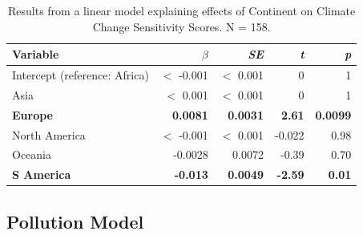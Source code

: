 \documentclass[11pt, a4paper, titlepage]{article}
\begin{document}
	
	\newpage
	
	\begin{table}[h!]
		\begin{center}
			\caption{Results from a linear model explaining effects of Continent on Climate Change Sensitivity Scores. \textmd{N = 158.}}
			\label{tab:climatetable}
			\begin{tabular}{l|r|r|r|r} %
				Variable & $\beta$ & \textit{SE} & \textit{t} & \textit{p}\\
				\hline
				Intercept (reference: Africa) & $<$ -0.001 & $<$ 0.001 & 0 & 1\\
				Asia & $<$ 0.001 & $<$ 0.001& 0 & 1\\
				\textbf{Europe} & \textbf{0.0081} & \textbf{0.0031} & \textbf{2.61} & \textbf{0.0099} \\
				North America & $<$ -0.001 & $<$ 0.001 & -0.022 & 0.98\\
				Oceania & -0.0028 & 0.0072 & -0.39 & 0.70\\
				\textbf{S America} & \textbf{-0.013} & \textbf{0.0049} & \textbf{-2.59} & \textbf{0.01}\\
			\end{tabular}
		\end{center}
	\end{table}
	

	\newpage
	
	\subsection*{Pollution Model}
	
\end{document}
